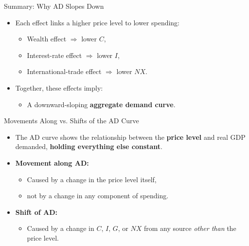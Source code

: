 \documentclass[aspectratio=169]{beamer}
\begin{document}
\begin{frame}{Summary: Why AD Slopes Down}
\transfade
\begin{itemize}
  \item Each effect links a higher price level to lower spending:
  \begin{itemize}
    \item Wealth effect \(\Rightarrow\) lower \(C\),
    \item Interest-rate effect \(\Rightarrow\) lower \(I\),
    \item International-trade effect \(\Rightarrow\) lower \(NX\).
  \end{itemize}
  \item Together, these effects imply:
  \begin{itemize}
    \item A downward-sloping \textbf{aggregate demand curve}.
  \end{itemize}
\end{itemize}
\end{frame}


\begin{frame}{Movements Along vs. Shifts of the AD Curve}
\transfade
\begin{itemize}
  \item The AD curve shows the relationship between the \textbf{price level} and real GDP demanded, \textbf{holding everything else constant}.
  \item \textbf{Movement along AD:}
  \begin{itemize}
    \item Caused by a change in the price level itself,
    \item not by a change in any component of spending.
  \end{itemize}
  \item \textbf{Shift of AD:}
  \begin{itemize}
    \item Caused by a change in \(C\), \(I\), \(G\), or \(NX\) from any source \emph{other than} the price level.
  \end{itemize}
\end{itemize}
\end{frame}

\end{document}
